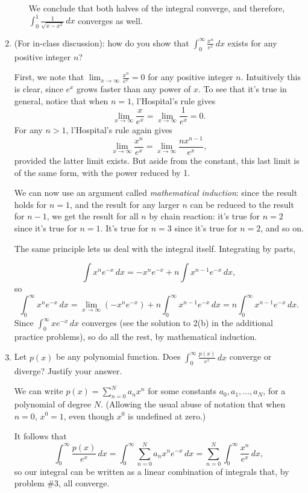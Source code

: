 \documentclass[12pt]{article}
\newcommand{\di}{\displaystyle}
\begin{document}
\begin{enumerate}
\begin{enumerate}
We conclude that both halves of the integral converge, and therefore,  $\di\int_0^1\frac{1}{\sqrt{x-x^2}}\,dx$ converges as well.
\end{enumerate}

\item (For in-class discussion): how do you show that $\di\int_0^\infty \frac{x^n}{e^{x}}\,dx$ exists for any positive integer $n$?

First, we note that $\di\lim_{x\to \infty}\frac{x^n}{e^x}=0$ for any positive integer $n$. Intuitively this is clear, since $e^x$ grows faster than any power of $x$. To see that it's true in general, notice that when $n=1$, l'Hospital's rule gives
\[
\lim_{x\to \infty}\frac{x}{e^x} = \lim_{x\to \infty}\frac{1}{e^x}=0.
\]
For any $n>1$, l'Hospital's rule again gives
\[
\lim_{x\to\infty}\frac{x^n}{e^x}=\lim_{x\to \infty}\frac{nx^{n-1}}{e^x},
\]
provided the latter limit exists. But aside from the constant, this last limit is of the same form, with the power reduced by 1. 

We can now use an argument called \textit{mathematical induction}: since the result holds for $n=1$, and the result for any larger $n$ can be reduced to the result for $n-1$, we get the result for all $n$ by chain reaction: it's true for $n=2$ since it's true for $n=1$. It's true for $n=3$ since it's true for $n=2$, and so on.

The same principle lets us deal with the integral itself. Integrating by parts,

\[
\int x^ne^{-x}\,dx = -x^ne^{-x}+n\int x^{n-1}e^{-x}\,dx,
\]
so
\[
\int_0^\infty x^ne^{-x}\,dx = \lim_{x\to\infty}(-x^ne^{-x}) + n\int_0^\infty x^{n-1}e^{-x}\,dx = n\int_0^\infty x^{n-1}e^{-x}\,dx.
\]
Since $\int_0^\infty xe^{-x}\,dx$ converges (see the solution to 2(b) in the additional practice problems), so do all the rest, by mathematical induction.


\item Let $p(x)$ be any polynomial function. Does $\di \int_0^\infty \frac{p(x)}{e^x}\,dx$ converge or diverge? Justify your answer.

We can write $\di p(x)=\sum_{n=0}^Na_nx^n$ for some constants $a_0,a_1,\ldots, a_N$, for a polynomial of degree $N$. (Allowing the usual abuse of notation that when $n=0$, $x^0=1$, even though $x^0$ is undefined at zero.)

It follows that
\[
\int_0^\infty \frac{p(x)}{e^x}\,dx = \int_0^\infty \sum_{n=0}^Na_nx^ne^{-x}\,dx = \sum_{n=0}^N\int_0^\infty\frac{x^n}{e^x}\,dx,
\]
so our integral can be written as a linear combination of integrals that, by problem \#3, all converge.


\end{enumerate}
\end{document}
